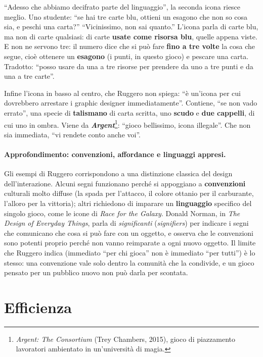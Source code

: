 ``Adesso che abbiamo decifrato parte del linguaggio'', la seconda icona riesce meglio.
Uno studente: ``se hai tre carte blu, ottieni un esagono che non so cosa sia, e peschi
una carta?'' ``Vicinissimo, non sai quanto.'' L'icona parla di carte blu, ma non di
carte qualsiasi: di carte \textbf{usate come risorsa blu}, quelle appena viste. E non ne
servono tre: il numero dice che si può fare \textbf{fino a tre volte} la cosa che
segue, cioè ottenere un \textbf{esagono} (i punti, in questo gioco) e pescare una
carta. Tradotto: ``posso usare da una a tre risorse per prendere da uno a tre punti e
da una a tre carte''.

Infine l'icona in basso al centro, che Ruggero non spiega: ``è un'icona per cui
dovrebbero arrestare i graphic designer immediatamente''. Contiene, ``se non vado
errato'', una specie di \textbf{talismano} di carta scritta, uno \textbf{scudo} e
\textbf{due cappelli}, di cui uno in ombra. Viene da \textbf{\emph{Argent}}\footnote{
\emph{Argent: The Consortium} (Trey Chambers, 2015), gioco di piazzamento lavoratori
ambientato in un'università di magia.}: ``gioco bellissimo, icona illegale''. Che non
sia immediata, ``vi rendete conto anche voi''.

\paragraph{Approfondimento: convenzioni, affordance e linguaggi appresi.} Gli esempi
di Ruggero corrispondono a una distinzione classica del design dell'interazione. Alcuni
segni funzionano perché si appoggiano a \textbf{convenzioni} culturali molto diffuse
(la spada per l'attacco, il colore ottanio per il carburante, l'alloro per la vittoria);
altri richiedono di imparare un \textbf{linguaggio} specifico del singolo gioco, come le
icone di \emph{Race for the Galaxy}. Donald Norman, in \emph{The Design of Everyday
Things}, parla di \emph{significanti} (\emph{signifiers}) per indicare i segni che
comunicano che cosa si può fare con un oggetto, e osserva che le convenzioni sono
potenti proprio perché non vanno reimparate a ogni nuovo oggetto. Il limite che Ruggero
indica (immediato ``per chi gioca'' non è immediato ``per tutti'') è lo stesso: una
convenzione vale solo dentro la comunità che la condivide, e un gioco pensato per un
pubblico nuovo non può darla per scontata.

\section{Efficienza}
\label{a10:sec:efficienza}

